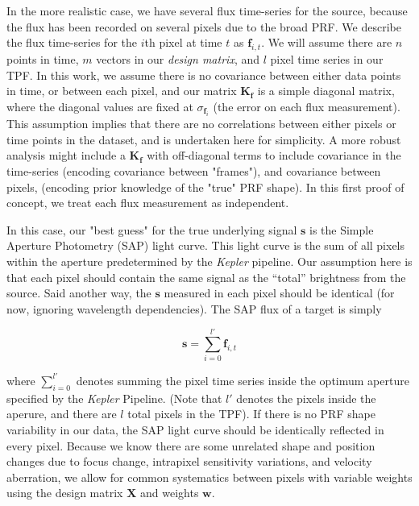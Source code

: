 \documentclass[iop]{emulateapj}
\newcommand{\kepler}{\emph{Kepler}\xspace}
\begin{document}
In the more realistic case, we have several flux time-series for the source, because the flux has been recorded on several pixels due to the broad PRF. We describe the flux time-series for the $i$th pixel at time $t$ as $\mathbf{f}_{i,t}$. We will assume there are $n$ points in time, $m$ vectors in our \emph{design matrix}, and $l$ pixel time series in our TPF. In this work, we assume there is no covariance between either data points in time, or between each pixel, and our matrix $\mathbf{K_f}$ is a simple diagonal matrix, where the diagonal values are fixed at $\sigma_{\mathbf{f}_i}$ (the error on each flux measurement).
%
This assumption implies that there are no correlations between either pixels or time points in the dataset, and is undertaken here for simplicity. A more robust analysis might include a $\mathbf{K_f}$ with off-diagonal terms to include covariance in the time-series (encoding covariance between "frames"), and covariance between pixels, (encoding prior knowledge of the "true" PRF shape). In this first proof of concept, we treat each flux measurement as independent.

In this case, our "best guess" for the true underlying signal $\mathbf{s}$ is the Simple Aperture Photometry (SAP) light curve. This light curve is the sum of all pixels within the aperture predetermined by the \kepler pipeline. Our assumption here is that each pixel should contain the same signal as the ``total'' brightness from the source. Said another way, the $\mathbf{s}$ measured in each pixel should be identical (for now, ignoring wavelength dependencies). The SAP flux of a target is simply

\begin{equation}  \mathbf{s} = \sum_{i=0}^{l'}\mathbf{f}_{i,t}\end{equation}

where $\sum_{i=0}^{l'}$ denotes summing the pixel time series inside the optimum aperture specified by the \kepler Pipeline. (Note that $l'$ denotes the pixels inside the aperure, and there are $l$ total pixels in the TPF). If there is no PRF shape variability in our data, the SAP light curve should be identically reflected in every pixel. Because we know there are some unrelated shape and position changes due to focus change, intrapixel sensitivity variations, and velocity aberration, we allow for common systematics between pixels with variable weights using the design matrix $\mathbf{X}$ and weights $\mathbf{w}$.
\end{document}
